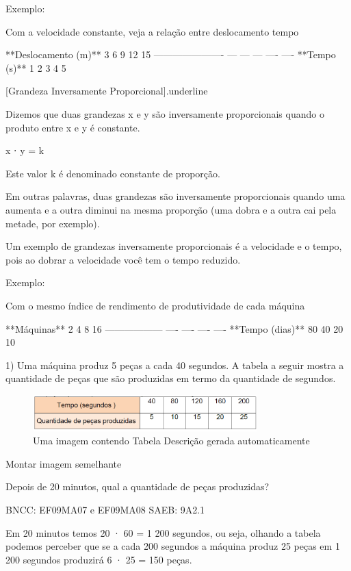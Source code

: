 \begin{escolha}
{{{\begin{escolha}
{{Exemplo:

Com a velocidade constante, veja a relação entre deslocamento tempo

  **Deslocamento (m)**   3   6   9   12   15
  ---------------------- --- --- --- ---- ----
  **Tempo (s)**          1   2   3   4    5

[Grandeza Inversamente Proporcional]{.underline}

Dizemos que duas grandezas x e y são inversamente proporcionais quando o
produto entre x e y é constante.

x ⋅ y = k

Este valor k é denominado constante de proporção.

Em outras palavras, duas grandezas são inversamente proporcionais quando
uma aumenta e a outra diminui na mesma proporção (uma dobra e a outra
cai pela metade, por exemplo).

Um exemplo de grandezas inversamente proporcionais é a velocidade e o
tempo, pois ao dobrar a velocidade você tem o tempo reduzido.

Exemplo:

Com o mesmo índice de rendimento de produtividade de cada máquina

  **Máquinas**       2    4    8    16
  ------------------ ---- ---- ---- ----
  **Tempo (dias)**   80   40   20   10
}


1) Uma máquina produz 5 peças a cada 40 segundos. A tabela a seguir
mostra a quantidade de peças que são produzidas em termo da quantidade
de segundos.

\begin{figure}
\centering
\includegraphics[width=3.41667in,height=0.55in]{./_SAEB_9_MAT/media/image132.png}
\caption{Uma imagem contendo Tabela Descrição gerada automaticamente}
\end{figure}

Montar imagem semelhante

Depois de 20 minutos, qual a quantidade de peças produzidas?

BNCC: EF09MA07 e EF09MA08 SAEB: 9A2.1

Em 20 minutos temos 20 · 60 = 1 200 segundos, ou seja, olhando a tabela
podemos perceber que se a cada 200 segundos a máquina produz 25 peças em
1 200 segundos produzirá 6 · 25 = 150 peças.

}
\end{escolha}}}}
\end{escolha}
